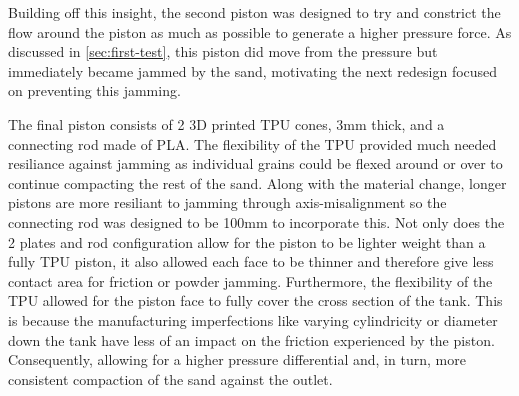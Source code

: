 Building off this insight, the second piston was designed to try and constrict the flow around the piston as much as possible to generate a higher pressure force. As discussed in \autoref{sec:first-test}, this piston did move from the pressure but immediately became jammed by the sand, motivating the next redesign focused on preventing this jamming.

The final piston consists of 2 3D printed TPU cones, 3mm thick, and a connecting rod made of PLA. The flexibility of the TPU provided much needed resiliance against jamming as individual grains could be flexed around or over to continue compacting the rest of the sand. Along with the material change, longer pistons are more resiliant to jamming through axis-misalignment so the connecting rod was designed to be 100mm to incorporate this. Not only does the 2 plates and rod configuration allow for the piston to be lighter weight than a fully TPU piston, it also allowed each face to be thinner and therefore give less contact area for friction or powder jamming. Furthermore, the flexibility of the TPU allowed for the piston face to fully cover the cross section of the tank. This is because the manufacturing imperfections like varying cylindricity or diameter down the tank have less of an impact on the friction experienced by the piston. Consequently, allowing for a higher pressure differential and, in turn, more consistent compaction of the sand against the outlet.


